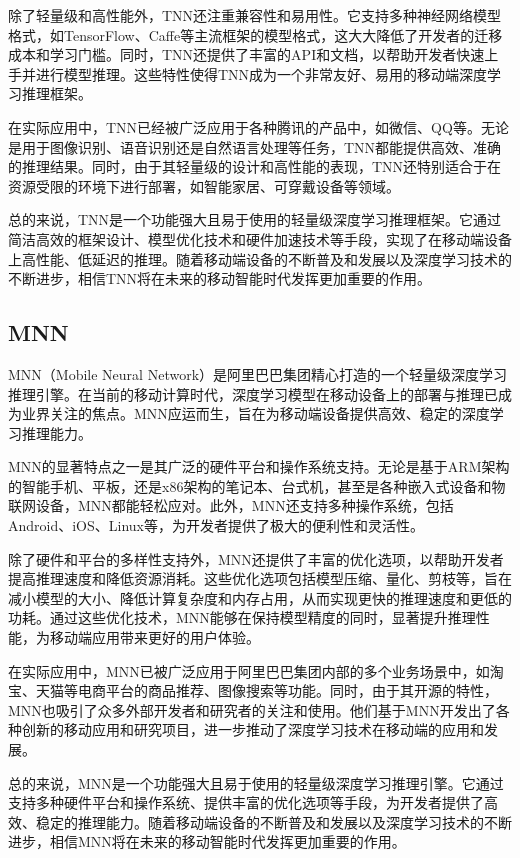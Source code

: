 除了轻量级和高性能外，TNN还注重兼容性和易用性。它支持多种神经网络模型格式，如TensorFlow、Caffe等主流框架的模型格式，这大大降低了开发者的迁移成本和学习门槛。同时，TNN还提供了丰富的API和文档，以帮助开发者快速上手并进行模型推理。这些特性使得TNN成为一个非常友好、易用的移动端深度学习推理框架。

在实际应用中，TNN已经被广泛应用于各种腾讯的产品中，如微信、QQ等。无论是用于图像识别、语音识别还是自然语言处理等任务，TNN都能提供高效、准确的推理结果。同时，由于其轻量级的设计和高性能的表现，TNN还特别适合于在资源受限的环境下进行部署，如智能家居、可穿戴设备等领域。

总的来说，TNN是一个功能强大且易于使用的轻量级深度学习推理框架。它通过简洁高效的框架设计、模型优化技术和硬件加速技术等手段，实现了在移动端设备上高性能、低延迟的推理。随着移动端设备的不断普及和发展以及深度学习技术的不断进步，相信TNN将在未来的移动智能时代发挥更加重要的作用。

\subsection{MNN}

MNN（Mobile Neural Network）是阿里巴巴集团精心打造的一个轻量级深度学习推理引擎。在当前的移动计算时代，深度学习模型在移动设备上的部署与推理已成为业界关注的焦点。MNN应运而生，旨在为移动端设备提供高效、稳定的深度学习推理能力。

MNN的显著特点之一是其广泛的硬件平台和操作系统支持。无论是基于ARM架构的智能手机、平板，还是x86架构的笔记本、台式机，甚至是各种嵌入式设备和物联网设备，MNN都能轻松应对。此外，MNN还支持多种操作系统，包括Android、iOS、Linux等，为开发者提供了极大的便利性和灵活性。

除了硬件和平台的多样性支持外，MNN还提供了丰富的优化选项，以帮助开发者提高推理速度和降低资源消耗。这些优化选项包括模型压缩、量化、剪枝等，旨在减小模型的大小、降低计算复杂度和内存占用，从而实现更快的推理速度和更低的功耗。通过这些优化技术，MNN能够在保持模型精度的同时，显著提升推理性能，为移动端应用带来更好的用户体验。

在实际应用中，MNN已被广泛应用于阿里巴巴集团内部的多个业务场景中，如淘宝、天猫等电商平台的商品推荐、图像搜索等功能。同时，由于其开源的特性，MNN也吸引了众多外部开发者和研究者的关注和使用。他们基于MNN开发出了各种创新的移动应用和研究项目，进一步推动了深度学习技术在移动端的应用和发展。

总的来说，MNN是一个功能强大且易于使用的轻量级深度学习推理引擎。它通过支持多种硬件平台和操作系统、提供丰富的优化选项等手段，为开发者提供了高效、稳定的推理能力。随着移动端设备的不断普及和发展以及深度学习技术的不断进步，相信MNN将在未来的移动智能时代发挥更加重要的作用。

